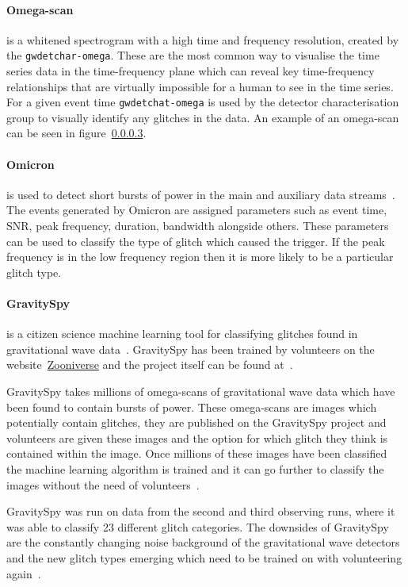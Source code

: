 \paragraph{Omega-scan}

is a whitened spectrogram with a high time and frequency resolution, created by the \verb|gwdetchar-omega|. These are the most common way to visualise the time series data in the time-frequency plane which can reveal key time-frequency relationships that are virtually impossible for a human to see in the time series. For a given event time \verb|gwdetchat-omega| is used by the detector characterisation group to visually identify any glitches in the data. An example of an omega-scan can be seen in figure~\ref{}.
%

\paragraph{Omicron}

is used to detect short bursts of power in the main and auxiliary data streams~\cite{}. The events generated by Omicron are assigned parameters such as event time, SNR, peak frequency, duration, bandwidth alongside others. These parameters can be used to classify the type of glitch which caused the trigger. If the peak frequency is in the low frequency region then it is more likely to be a particular glitch type.

\paragraph{GravitySpy}

is a citizen science machine learning tool for classifying glitches found in gravitational wave data~\cite{}. GravitySpy has been trained by volunteers on the website~\href{Zooniverse}{Zooniverse} and the project itself can be found at~\href{}{}.

GravitySpy takes millions of omega-scans of gravitational wave data which have been found to contain bursts of power. These omega-scans are images which potentially contain glitches, they are published on the GravitySpy project and volunteers are given these images and the option for which glitch they think is contained within the image. Once millions of these images have been classified the machine learning algorithm is trained and it can go further to classify the images without the need of volunteers~\cite{}.

GravitySpy was run on data from the second and third observing runs, where it was able to classify 23 different glitch categories. The downsides of GravitySpy are the constantly changing noise background of the gravitational wave detectors and the new glitch types emerging which need to be trained on with volunteering again~\cite{}.

